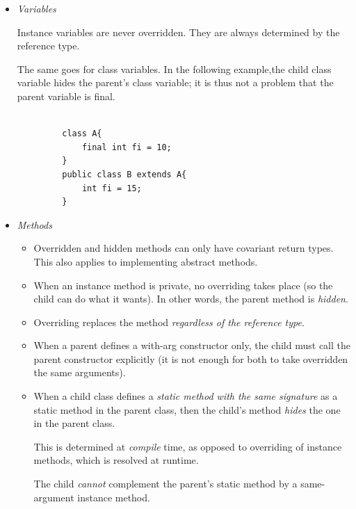\documentclass{scrartcl}
\begin{document}
    \begin{itemize}
        \item \textit{Variables}

        Instance variables are never overridden. They are always determined by the reference type.

        The same goes for class variables. In the following example,the child class variable hides the parent's class variable; it is thus not a problem that the parent variable is final.

        \begin{lstlisting}

         class A{
             final int fi = 10;
         }
         public class B extends A{
             int fi = 15;
         }
         \end{lstlisting}

        \item \textit{Methods}

        \begin{itemize}
            \item  Overridden and hidden methods can only have covariant return types.
            This also applies to implementing abstract methods.
            \item
            When an instance method is private, no overriding takes place (so the child can do what it wants). In other words, the parent method is \textit{hidden}.

             \item
            Overriding replaces the method \textit{regardless of the reference type}.

             \item
            When a parent defines a with-arg constructor only, the child must call the parent constructor
            explicitly (it is not enough for both to take overridden the same arguments).

            \item
            When a child class defines a \textit{static method with the same signature} as a static method in the parent class, then the child’s method \textit{hides} the one in the parent class.

            This is determined at \textit{compile} time, as opposed to overriding of instance methods, which is resolved at runtime.

            The child \textit{cannot} complement the parent's static method by a same-argument instance method.
        \end{itemize}



    \end{itemize}
\end{document}
